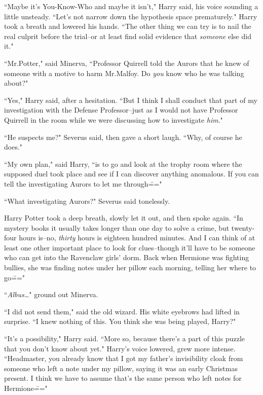 ``Maybe it's You-Know-Who and maybe it isn't," Harry said, his voice sounding a little unsteady. ``Let's not narrow down the hypothesis space prematurely." Harry took a breath and lowered his hands. ``The other thing we can try is to nail the real culprit before the trial\---or at least find solid evidence that \emph{someone} else did it."

``Mr.\?Potter," said Minerva, ``Professor Quirrell told the Aurors that he knew of someone with a motive to harm Mr.\?Malfoy. Do \emph{you} know who he was talking about?"

``Yes," Harry said, after a hesitation. ``But I think I shall conduct that part of my investigation with the Defense Professor\---just as I would not have Professor Quirrell in the room while we were discussing how to investigate \emph{him}."

``He suspects me?" Severus said, then gave a short laugh. ``Why, of course he does."

``My own plan," said Harry, ``is to go and look at the trophy room where the supposed duel took place and see if I can discover anything anomalous. If you can tell the investigating Aurors to let me through\==="

``What investigating Aurors?" Severus said tonelessly.

Harry Potter took a deep breath, slowly let it out, and then spoke again. ``In mystery books it usually takes longer than one day to solve a crime, but twenty-four hours is\---no, \emph{thirty} hours is eighteen hundred minutes. And I can think of at least one other important place to look for clues\---though it'll have to be someone who can get into the Ravenclaw girls' dorm. Back when Hermione was fighting bullies, she was finding notes under her pillow each morning, telling her where to go\==="

``\emph{Albus{\ldots}}" ground out Minerva.

``I did not send them," said the old wizard. His white eyebrows had lifted in surprise. ``I knew nothing of this. You think she was being played, Harry?"

``It's a possibility," Harry said. ``More so, because there's a part of this puzzle that you don't know about yet." Harry's voice lowered, grew more intense. ``Headmaster, you already know that I got my father's invisibility cloak from someone who left a note under my pillow, saying it was an early Christmas present. I think we have to assume that's the same person who left notes for Hermione\==="

